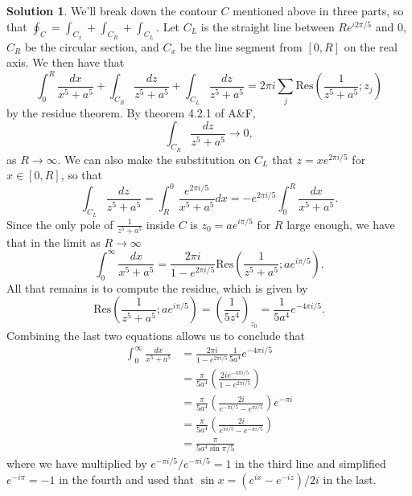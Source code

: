 \documentclass[12pt]{article}
\newcommand{\Res}{\text{Res}}
\theoremstyle{definition}
\newtheorem{sol}{Solution}
\theoremstyle{remark}
\begin{document}
\begin{sol}
    We'll break down the contour $C$ mentioned above in three parts, so that $\oint_C=\int_{C_x} + \int_{C_R} + \int_{C_L}$. Let $C_L$ is the straight line between $Re^{i 2\pi/5}$ and $0$, $C_R$ be the circular section, and $C_x$ be the line segment from $[0, R]$ on the real axis. We then have that
\begin{equation}
   \int_{0}^{R}  \frac{dx}{x^5+a^5} +   \int_{C_R}  \frac{dz}{z^5+a^5} +  \int_{C_L}  \frac{dz}{z^5+a^5} = 2\pi i \sum_j \Res \left(  \frac{1}{z^5+a^5}; z_j  \right) 
\end{equation}
by the residue theorem. By theorem 4.2.1 of A\&F, 
\begin{equation}
    \int_{C_R}  \frac{dz}{z^5+a^5} \to 0,
\end{equation} as $R\to\infty$. We can also make the substitution on $C_L$ that $z = xe^{2\pi i/5}$ for $x\in [0,R]$, so that
\begin{equation}
    \int_{C_L}  \frac{dz}{z^5+a^5} = \int_{R}^{0} \frac{e^{2\pi i/5}}{x^5+a^5}dx = - e^{2\pi i/5}  \int_{0}^{R}  \frac{dx}{x^5+a^5}. 
\end{equation}
Since the only pole of $\frac{1}{z^5+a^5}$ inside $C$ is $z_0 = ae^{i\pi/5}$ for $R$ large enough, we have that in the limit as $R\to\infty$
\begin{equation}
    \int_0^\infty \frac{dx}{x^5+a^5} = \frac{2\pi i}{1 - e^{2\pi i/5}} \Res \left(  \frac{1}{z^5+a^5};  ae^{i\pi/5} \right). 
\end{equation}
All that remains is to compute the residue, which is given by
\begin{equation}
    \Res \left(  \frac{1}{z^5+a^5}; ae^{i\pi/5} \right) = \left( \frac{1}{5z^4} \right)_{z_0} = \frac{1}{5a^4} e^{-4\pi i / 5}.
\end{equation}
Combining the last two equations allows us to conclude that
\begin{align}
    \int_0^\infty \frac{dx}{x^5+a^5} &= \frac{2\pi i}{1 - e^{2\pi i/5}}\frac{1}{5a^4} e^{-4\pi i / 5}\\
                                     &= \frac{\pi}{5a^4}\left( \frac{2i e^{-4\pi i/5}}{1 - e^{2\pi i/5}}\right)\\
                                     &= \frac{\pi}{5a^4}\left( \frac{2i}{e^{-\pi i/5} - e^{\pi i/5}}\right) e^{-\pi i}\\
                                     &= \frac{\pi}{5a^4}\left( \frac{2i}{e^{\pi i/5} - e^{-\pi i/5}}\right)\\ 
                                     &=  \frac{\pi}{5a^4 \sin \pi/5}
\end{align}
where we have multiplied by $e^{-\pi i /5} /e^{-\pi i /5} =1$ in the third line and simplified $e^{-i\pi} = -1$ in the fourth and used that $\sin x =(e^{ix} - e^{-iz} )/2i$ in the last.
\end{sol}
\end{document}
